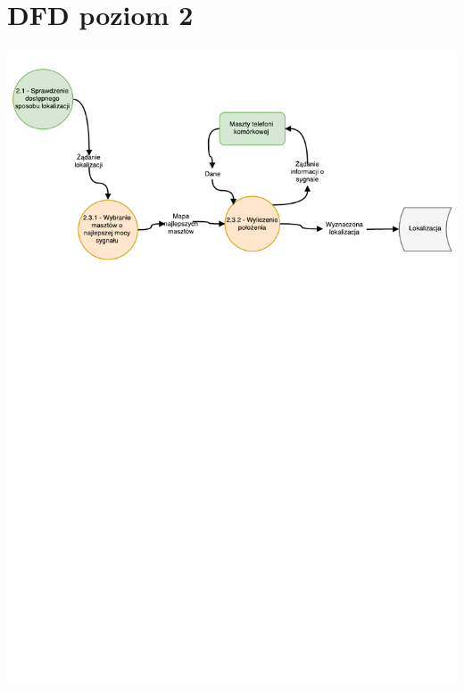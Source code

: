 \documentclass[11pt]{article}
\begin{document}
	\section{DFD poziom 2}
	\begin{center}
		\includegraphics[scale=0.8]{DFD23.pdf}
	\end{center}
	\newpage
\end{document}
